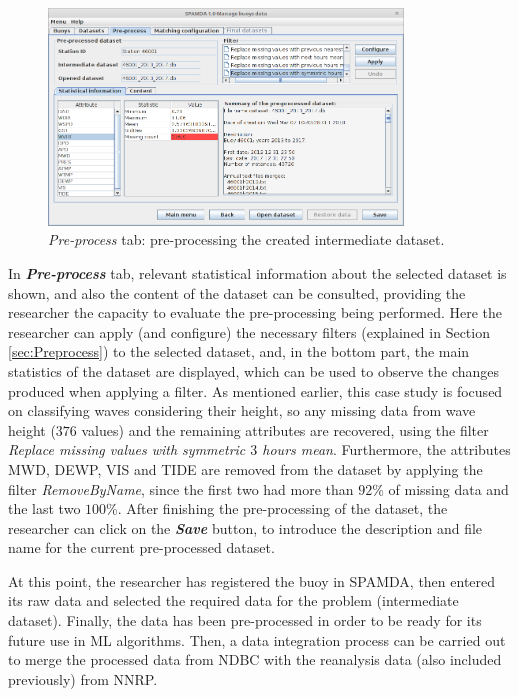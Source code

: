 \documentclass[energies,article,submit,moreauthors,pdftex]{Definitions/mdpi}
\begin{document}
			\begin{figure}[ht!]
				\centering
				\includegraphics[width=0.84\textwidth]{figures/FigurePreprocess.png}
				\caption{\textit{Pre-process} tab: pre-processing the created intermediate dataset.}\label{fig:preprocess_data}
			\end{figure}
			
			In \textbf{\textit{Pre-process}} tab, relevant statistical information about the selected dataset is shown, and also the content of the dataset can be consulted, providing the researcher the capacity to evaluate the pre-processing being performed. Here the researcher can apply (and configure) the necessary filters (explained in Section \ref{sec:Preprocess}) to the selected dataset, and, in the bottom part, the main statistics of the dataset are displayed, which can be used to observe the changes produced when applying a filter. As mentioned earlier, this case study is focused on classifying waves considering their height, so any missing data from wave height ($376$ values) and the remaining attributes are recovered, using the filter \textit{Replace missing values with symmetric $3$ hours mean}. Furthermore, the attributes MWD, DEWP, VIS and TIDE are removed from the dataset by applying the filter \textit{RemoveByName}, since the first two had more than $92$\% of missing data and the last two $100$\%. After finishing the pre-processing of the dataset, the researcher can click on the \textbf{\textit{Save}} button, to introduce the description and file name for the current pre-processed dataset.
			
			At this point, the researcher has registered the buoy in SPAMDA, then entered its raw data and selected the required data for the problem (intermediate dataset). Finally, the data has been pre-processed in order to be ready for its future use in ML algorithms. Then, a data integration process can be carried out to merge the processed data from NDBC with the reanalysis data (also included previously) from NNRP.
			
\end{document}
